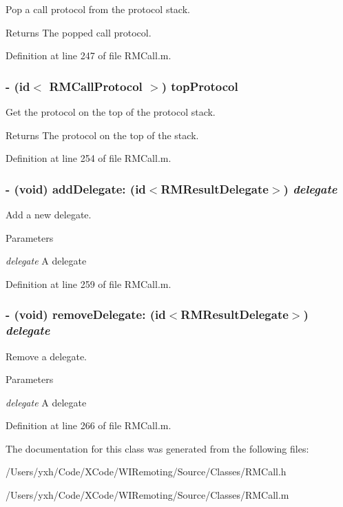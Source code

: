 Pop a call protocol from the protocol stack. \begin{DoxyReturn}{Returns}
The popped call protocol. 
\end{DoxyReturn}


Definition at line 247 of file RMCall.m.\hypertarget{interface_r_m_call_a306021de3467cc71a876068cbed9d834}{
\subsubsection[{topProtocol}]{\setlength{\rightskip}{0pt plus 5cm}-\/ (id$<$ {\bf RMCallProtocol} $>$) topProtocol }}
\label{interface_r_m_call_a306021de3467cc71a876068cbed9d834}


Get the protocol on the top of the protocol stack. \begin{DoxyReturn}{Returns}
The protocol on the top of the stack. 
\end{DoxyReturn}


Definition at line 254 of file RMCall.m.\hypertarget{interface_r_m_call_a24b00b6c098e4c14b267fafb186d2493}{
\subsubsection[{addDelegate:}]{\setlength{\rightskip}{0pt plus 5cm}-\/ (void) addDelegate: (id$<${\bf RMResultDelegate}$>$) {\em delegate}}}
\label{interface_r_m_call_a24b00b6c098e4c14b267fafb186d2493}


Add a new delegate. 
\begin{DoxyParams}{Parameters}
\item[{\em delegate}]A delegate \end{DoxyParams}


Definition at line 259 of file RMCall.m.\hypertarget{interface_r_m_call_a134cc51db3b462b9108b30e449f8b5bb}{
\subsubsection[{removeDelegate:}]{\setlength{\rightskip}{0pt plus 5cm}-\/ (void) removeDelegate: (id$<${\bf RMResultDelegate}$>$) {\em delegate}}}
\label{interface_r_m_call_a134cc51db3b462b9108b30e449f8b5bb}


Remove a delegate. 
\begin{DoxyParams}{Parameters}
\item[{\em delegate}]A delegate \end{DoxyParams}


Definition at line 266 of file RMCall.m.

The documentation for this class was generated from the following files:\begin{DoxyCompactItemize}
\item 
/Users/yxh/Code/XCode/WIRemoting/Source/Classes/RMCall.h\item 
/Users/yxh/Code/XCode/WIRemoting/Source/Classes/RMCall.m\end{DoxyCompactItemize}
